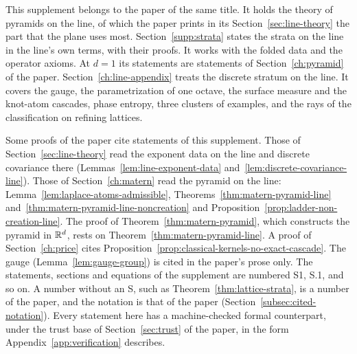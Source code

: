 This supplement belongs to the paper of the same title. It holds the theory of pyramids on the line,
of which the paper prints in its Section~\ref{sec:line-theory} the part that the plane uses most.
Section~\ref{supp:strata} states the strata on the line in the line's own terms, with their proofs.
It works with the folded \Levy{} data and the operator axioms. At $d = 1$ its statements are
statements of Section~\ref{ch:pyramid} of the paper. Section~\ref{ch:line-appendix} treats the
discrete stratum on the line. It covers the gauge, the parametrization of one octave, the surface
measure and the knot-atom cascades, phase entropy, three clusters of examples, and the rays of the
classification on refining lattices.

Some proofs of the paper cite statements of this supplement. Those of
Section~\ref{sec:line-theory} read the exponent data on the line and discrete covariance there
(Lemmas~\ref{lem:line-exponent-data} and~\ref{lem:discrete-covariance-line}). Those of
Section~\ref{ch:matern} read the \Matern{} pyramid on the line: Lemma~\ref{lem:laplace-atoms-admissible},
Theorems~\ref{thm:matern-pyramid-line} and~\ref{thm:matern-pyramid-line-noncreation} and
Proposition~\ref{prop:ladder-non-creation-line}. The proof of Theorem~\ref{thm:matern-pyramid}, which
constructs the \Matern{} pyramid in $\mathbb{R}^d$, rests on Theorem~\ref{thm:matern-pyramid-line}. A proof
of Section~\ref{ch:price} cites Proposition~\ref{prop:classical-kernels-no-exact-cascade}. The gauge
(Lemma~\ref{lem:gauge-group}) is cited in the paper's prose only. The
statements, sections and equations of the supplement are numbered S1, S.1, and so on. A number
without an S, such as Theorem~\ref{thm:lattice-strata}, is a number of the paper, and the notation
is that of the paper (Section~\ref{subsec:cited-notation}). Every statement here has a
machine-checked formal counterpart, under the trust base of Section~\ref{sec:trust} of the paper,
in the form Appendix~\ref{app:verification} describes.
